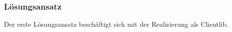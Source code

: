\subsubsection{Lösungsansatz }
\label{sec:sol_clientlib}

Der erste Lösungsansatz beschäftigt sich mit der Realisierung als Clientlib.



